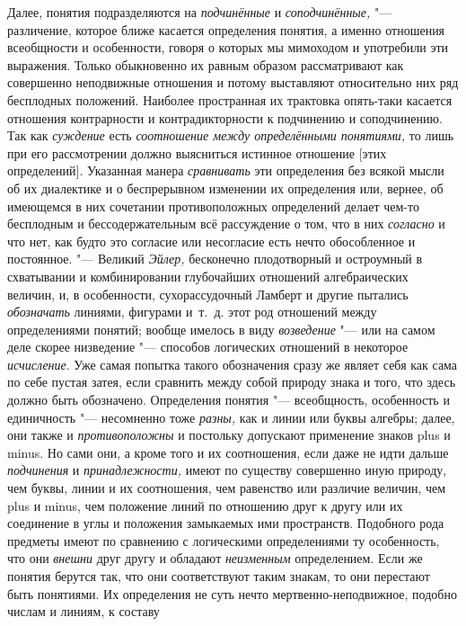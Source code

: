 Далее, понятия подразделяются на {\em подчинённые} и {\em соподчинённые,} "---
различение, которое ближе касается определения понятия, а именно отношения
всеобщности и особенности, говоря о которых мы мимоходом и употребили эти
выражения.
Только обыкновенно их равным образом
рассматривают как совершенно неподвижные отношения и потому выставляют
относительно них ряд бесплодных положений. Наиболее пространная их
трактовка опять-таки касается отношения контрарности и контрадикторности к
подчинению и соподчинению. Так как {\em суждение} есть {\em соотношение между
определёнными понятиями,} то лишь при его рассмотрении должно выясниться
истинное отношение [этих определений]. Указанная манера {\em сравнивать} эти
определения без всякой мысли об их диалектике и о беспрерывном изменении их
определения или, вернее, об имеющемся в них сочетании противоположных
определений делает чем-то бесплодным и бессодержательным всё рассуждение о
том, что в них {\em согласно} и что нет, как будто это согласие или несогласие
есть нечто обособленное и постоянное. "--- Великий {\em Эйлер,} бесконечно
плодотворный и остроумный в схватывании и комбинировании глубочайших
отношений алгебраических величин, и, в особенности, сухорассудочный Ламберт
и другие пытались {\em обозначать} линиями, фигурами и~т.~д. этот род отношений
между определениями понятий; вообще имелось в виду {\em возведение} "--- или на
самом деле скорее низведение "--- способов логических отношений в некоторое
{\em исчисление}. Уже самая попытка такого обозначения сразу же являет себя
как сама по себе пустая затея, если сравнить между собой природу знака и того,
что здесь должно быть обозначено. Определения понятия "--- всеобщность,
особенность и единичность "--- несомненно тоже {\em разны,} как и линии или
буквы алгебры; далее, они также и {\em противоположны} и постольку допускают
применение знаков plus и minus. Но сами они, а кроме того и их соотношения,
если даже не идти дальше {\em подчинения} и {\em принадлежности,} имеют по
существу совершенно иную природу, чем буквы, линии и их соотношения, чем
равенство или различие величин, чем plus и minus, чем положение линий по
отношению друг к другу или их соединение в углы и положения замыкаемых ими
пространств. Подобного рода предметы имеют по сравнению с логическими
определениями ту особенность, что они {\em внешни} друг другу и обладают {\em
неизменным} определением. Если же понятия берутся так, что они
соответствуют таким знакам, то они перестают быть понятиями. Их определения
не суть нечто мертвенно-неподвижное, подобно числам и линиям, к составу
